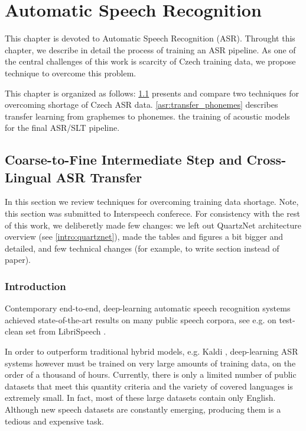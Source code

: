 \chapter{Automatic Speech Recognition}
\label{chapter:asr}

This chapter is devoted to Automatic Speech Recognition (ASR). Throught this chapter, we describe in detail the process of training an ASR pipeline. As one of the central challenges of this work is scarcity of Czech training data, we propose technique to overcome this problem. 

This chapter is organized as follows: \cref{asr:crosslingual_intermediate} presents and compare two techniques for overcoming shortage of Czech ASR data. \cref{asr:transfer_phonemes} describes transfer learning from graphemes to phonemes.  the training of acoustic models for the final ASR/SLT pipeline. 


\section{Coarse-to-Fine Intermediate Step and Cross-Lingual ASR Transfer}
\label{asr:crosslingual_intermediate}

In this section we review techniques for overcoming training data shortage. Note, this section was submitted to Interspeech conferece. For consistency with the rest of this work, we deliberetly made few changes: we left out QuartzNet architecture overview (see \cref{intro:quartznet}), made the tables and figures a bit bigger and detailed, and few technical changes (for example, to write section instead of paper). 

\subsection{Introduction}

Contemporary end-to-end, deep-learning automatic speech recognition systems achieved state-of-the-art results on many public speech corpora, see e.g. 
on test-clean set from LibriSpeech .

In order to outperform traditional hybrid models, e.g. Kaldi , deep-learning ASR systems however must be trained on very large amounts of training data, on the order of a thousand of hours. Currently, there is only a limited number of public datasets that meet this quantity criteria and the variety of covered languages is extremely small. In fact, most of these large datasets contain only English. Although new speech datasets are constantly emerging, producing them is a tedious and expensive task.

